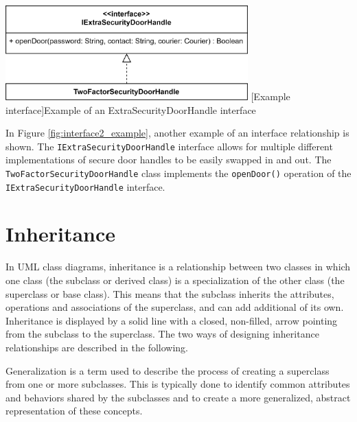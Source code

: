 \documentclass[
	12pt,
    a4paper,
    egregdoesnotlikesansseriftitles, %
    toc=chapterentrywithdots,
    oneside, openany,
    titlepage,
    parskip=half,
    headings=normal,  %
    listof=totoc,
    bibliography=totocnumbered,
    index=totoc,
    captions=tableheading,  %
    listof=flat,
    numbers=noenddot, %
    final]
    {scrbook}
\begin{document}
\vspace{1em}
\begin{minipage}{\linewidth}
	\centering
	\includegraphics[width=0.7\textwidth]{figures/interface/doorhandle_sec_interface.jpg}
	[Example interface]{Example of an ExtraSecurityDoorHandle interface}
	\label{fig:interface2_example}
\end{minipage}

In Figure \ref{fig:interface2_example}, another example of an interface relationship is shown. 
The \texttt{IExtraSecurityDoorHandle} interface allows for multiple different implementations of secure door handles to be easily swapped in and out. The \texttt{TwoFactorSecurityDoorHandle} class implements the \texttt{openDoor()} operation of the \texttt{IExtraSecurityDoorHandle} interface.


\chapter{Inheritance}
In UML class diagrams, inheritance is a relationship between two classes in which one class (the subclass or derived class) is a specialization of the other class (the superclass or base class). 
This means that the subclass inherits the attributes, operations and associations of the superclass, and can add additional of its own.
Inheritance is displayed by a solid line with a closed, non-filled, arrow pointing from the subclass to the superclass. \cite{ibm_generalization}
The two ways of designing inheritance relationships are described in the following.

Generalization is a term used to describe the process of creating a superclass from one or more subclasses. 
This is typically done to identify common attributes and behaviors shared by the subclasses and to create a more generalized, abstract representation of these concepts. \cite[p. 69-70] {seidl2015uml} \cite{ibm_generalization} 
\end{document}
